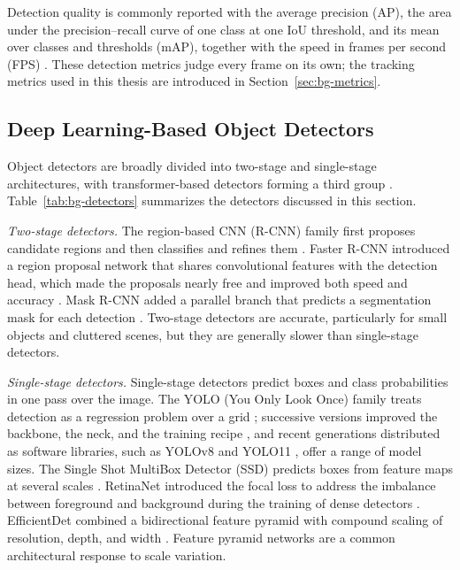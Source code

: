 Detection quality is commonly reported with the average precision (AP), the area under the precision--recall curve of one class at one IoU threshold, and its mean over classes and thresholds (mAP), together with the speed in frames per second (FPS) \cite{lin2014coco,ismail2026realtime}. These detection metrics judge every frame on its own; the tracking metrics used in this thesis are introduced in Section~\ref{sec:bg-metrics}.

\subsection{Deep Learning-Based Object Detectors}\label{sec:bg-detectors}
Object detectors are broadly divided into two-stage and single-stage architectures, with transformer-based detectors forming a third group \cite{ismail2026realtime}. Table~\ref{tab:bg-detectors} summarizes the detectors discussed in this section.

\emph{Two-stage detectors.} The region-based CNN (R-CNN) family first proposes candidate regions and then classifies and refines them \cite{girshick2014rcnn}. Faster R-CNN introduced a region proposal network that shares convolutional features with the detection head, which made the proposals nearly free and improved both speed and accuracy \cite{ren2017fasterrcnn}. Mask R-CNN added a parallel branch that predicts a segmentation mask for each detection \cite{he2017maskrcnn}. Two-stage detectors are accurate, particularly for small objects and cluttered scenes, but they are generally slower than single-stage detectors.

\emph{Single-stage detectors.} Single-stage detectors predict boxes and class probabilities in one pass over the image. The YOLO (You Only Look Once) family treats detection as a regression problem over a grid \cite{redmon2016yolo}; successive versions improved the backbone, the neck, and the training recipe \cite{redmon2018yolov3,bochkovskiy2020yolov4,ge2021yolox,wang2024yolov9}, and recent generations distributed as software libraries, such as YOLOv8 \cite{jocher2023yolov8} and YOLO11 \cite{jocher2024yolo11}, offer a range of model sizes. The Single Shot MultiBox Detector (SSD) predicts boxes from feature maps at several scales \cite{liu2016ssd}. RetinaNet introduced the focal loss to address the imbalance between foreground and background during the training of dense detectors \cite{lin2017focal}. EfficientDet combined a bidirectional feature pyramid with compound scaling of resolution, depth, and width \cite{tan2020efficientdet}. Feature pyramid networks \cite{lin2017fpn} are a common architectural response to scale variation.


